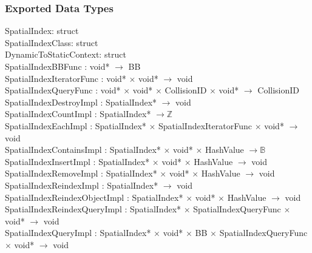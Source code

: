 \documentclass[12pt]{article}
\begin{document}
\subsubsection{Exported Data Types} \label{SecEDTSpatial}
	SpatialIndex: struct \\
	SpatialIndexClass: struct \\
	DynamicToStaticContext: struct \\
	SpatialIndexBBFunc : void* $\to$ BB \\
	SpatialIndexIteratorFunc : void* $\times$ void* $\to$ void \\
	SpatialIndexQueryFunc : void* $\times$ void* $\times$ CollisionID $\times$ void* $\to$ CollisionID \\
	SpatialIndexDestroyImpl : SpatialIndex* $\to$ void \\
	SpatialIndexCountImpl : SpatialIndex* $\to \mathbb{Z}$ \\
	SpatialIndexEachImpl : SpatialIndex* $\times$ SpatialIndexIteratorFunc $\times$ void* $\to$ void \\
	SpatialIndexContainsImpl : SpatialIndex* $\times$ void* $\times$ HashValue $\to \mathbb{B}$ \\
	SpatialIndexInsertImpl : SpatialIndex* $\times$ void* $\times$ HashValue $\to$ void \\
	SpatialIndexRemoveImpl : SpatialIndex* $\times$ void* $\times$ HashValue $\to$ void \\
	SpatialIndexReindexImpl : SpatialIndex* $\to$ void \\
	SpatialIndexReindexObjectImpl : SpatialIndex* $\times$ void* $\times$ HashValue $\to$ void \\
	SpatialIndexReindexQueryImpl : SpatialIndex* $\times$ SpatialIndexQueryFunc $\times$ void* $\to$ void \\
	SpatialIndexQueryImpl : SpatialIndex* $\times$ void* $\times$ BB $\times$ SpatialIndexQueryFunc $\times$ void* $\to$ void
\end{document}
